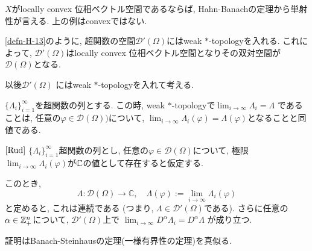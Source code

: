 $X$がlocally convex 位相ベクトル空間であるならば, Hahn-Banachの定理から単射性が言える. 上の例はconvexではない. 

\begin{tcolorbox}[mybox]
\begin{defn}{\cite[6.16]{Rud}}
\label{defn-H-14}
\ref{defn-H-13}のように, 超関数の空間\(\mathcal{D}'(\Omega)\)にはweak \( * \)-topologyを入れる. 
これによって,  \(\mathcal{D}'(\Omega)\)はlocally convex 位相ベクトル空間となりその双対空間が \(\mathcal{D}(\Omega)\)となる. 
\end{defn}
\end{tcolorbox}
以後\(\mathcal{D}'(\Omega)\) にはweak \( * \)-topologyを入れて考える.



\begin{rem}{\cite[6.16]{Rud}}
\label{rem-H-15} %
\(\{\Lambda_i\}_{i=1}^\infty\)を超関数の列とする. 
この時, weak \( * \)-topologyで\(\displaystyle \lim_{i \to \infty} \Lambda_i = \Lambda\) であることは, 
任意の$\varphi \in \mathcal{D}(\Omega))$について, \(\lim_{i \to \infty} \Lambda_i(\varphi) = \Lambda(\varphi)
\)となることと同値である. 
\end{rem}



\begin{tcolorbox}[mybox]
\begin{thm}{$\cite[Thm 6.17]{Rud}$}
\label{thm-H-16}
$\{\Lambda_i\}_{i=1}^\infty$超関数の列とし, 
任意の$\varphi \in \mathcal{D}(\Omega)$について, 
極限\(\lim_{i \to \infty} \Lambda_i(\varphi) \)が$\mathbb{C}$の値として存在すると仮定する.

このとき, \[
\Lambda : \mathcal{D}(\Omega) \to \mathbb{C}, \quad \Lambda(\varphi) := \lim_{i \to \infty} \Lambda_i(\varphi)
\]
と定めると, これは連続である (つまり, $\Lambda \in \mathcal{D}'(\Omega)$である).
さらに任意の$\alpha \in \mathbb{Z}_+^n$について, $\mathcal{D}'(\Omega)$上で
\(\lim_{i \to \infty} D^\alpha \Lambda_i = D^\alpha \Lambda\)
が成り立つ. 
\end{thm}
\end{tcolorbox}
証明はBanach-Steinhausの定理(一様有界性の定理)を真似る.

